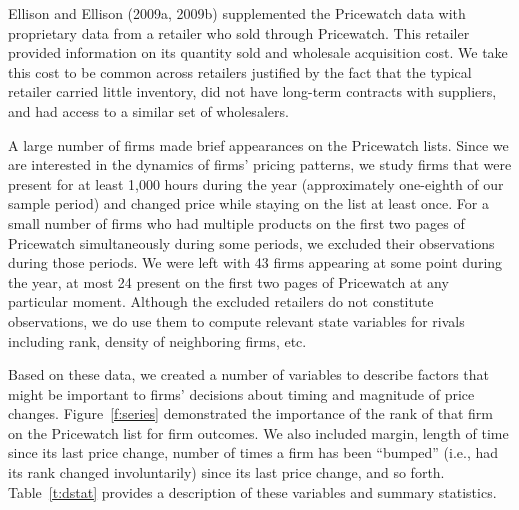 \documentclass[11pt]{article}
\begin{document}
\begin{spacing}{1.3}
Ellison and Ellison (2009a, 2009b) supplemented the Pricewatch data
with proprietary data from a retailer who sold through Pricewatch.
This retailer provided information on its quantity sold and wholesale
acquisition cost. We take this cost to be common across retailers
justified by the fact that the typical retailer carried little
inventory, did not have long-term contracts with suppliers, and had
access to a similar set of wholesalers.

A large number of firms made brief appearances on the Pricewatch
lists.  Since we are interested in the dynamics of firms' pricing
patterns, we study firms that were present for at least 1,000 hours
during the year (approximately one-eighth of our sample period) and
changed price while staying on the list at least once.  For a small
number of firms who had multiple products on the first two pages of
Pricewatch simultaneously during some periods, we excluded their
observations during those periods.  We were left with 43 firms
appearing at some point during the year, at most 24 present on the
first two pages of Pricewatch at any particular moment. Although the
excluded retailers do not constitute observations, we do use them to
compute relevant state variables for rivals including rank, density of
neighboring firms, etc.

Based on these data, we created a number of variables to describe
factors that might be important to firms' decisions about timing and
magnitude of price changes. Figure~\ref{f:series} demonstrated the
importance of the rank of that firm on the Pricewatch list for firm
outcomes. We also included margin, length of time since its last price
change, number of times a firm has been ``bumped'' (i.e., had its rank
changed involuntarily) since its last price change, and so forth.
Table~\ref{t:dstat} provides a description of these variables and
summary statistics.


\end{spacing}
\end{document}
